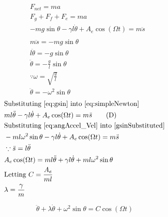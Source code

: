 \documentclass[letterpaper, 12pt]{article}
\begin{document}
\begingroup
\allowdisplaybreaks
\begin{paracol}{2}
    \begin{align*}
         & F_{net}                                                   = ma
        \\
         & F_g + F_f + F_e                                           = ma
        \\
         & -mg\sin\theta - \gamma l\dot\theta + A_e \cos (\Omega t)  = m\ddot s \tag{A} \label{eq:simpleNewton}
        \\
        \\
         & m\ddot s                                                  = -mg \sin\theta
        \\
         & l\ddot \theta                                             = -g\sin\theta \tag{B} \label{eq:gsin}
        \\
         & \ddot\theta                                               = -\frac{g}{l}\sin\theta
        \\
         & \because \omega                                          = \sqrt{\frac{g}{l}}
        \\
         & \ddot\theta                                               = -\omega^2\sin\theta \tag{C} \label{eq:angAccel_Vel}
    \end{align*}
    \switchcolumn
    \begin{align*}
         & \text{Substituting \ref*{eq:gsin} into \ref*{eq:simpleNewton}}
        \\
         & ml\ddot\theta - \gamma l\dot\theta + A_e \cos (\Omega t)                = m\ddot s \tag{D} \label{gsinSubstituted}
        \\
         & \text{Substituting \ref*{eq:angAccel_Vel} into \ref*{gsinSubstituted}}
        \\
         & -ml\omega^2\sin\theta - \gamma l\dot\theta + A_e \cos (\Omega t)        = m\ddot s
        \\
         & \because \ddot s                                                        = l\ddot \theta
        \\
         & A_e\cos(\Omega t)                                                       = ml\ddot \theta + \gamma l\dot\theta + ml\omega^2\sin\theta
        \\
         & \text{Letting } C                                                       = \frac{A_e}{ml}
        \\
         & \lambda                                                                 = \frac{\gamma}{m}
    \end{align*}
\end{paracol}
\endgroup
\begin{equation} \label{eq:noApproximate}
    \ddot\theta + \lambda\dot\theta + \omega^2\sin\theta = C\cos(\Omega t)
\end{equation}
\end{document}
